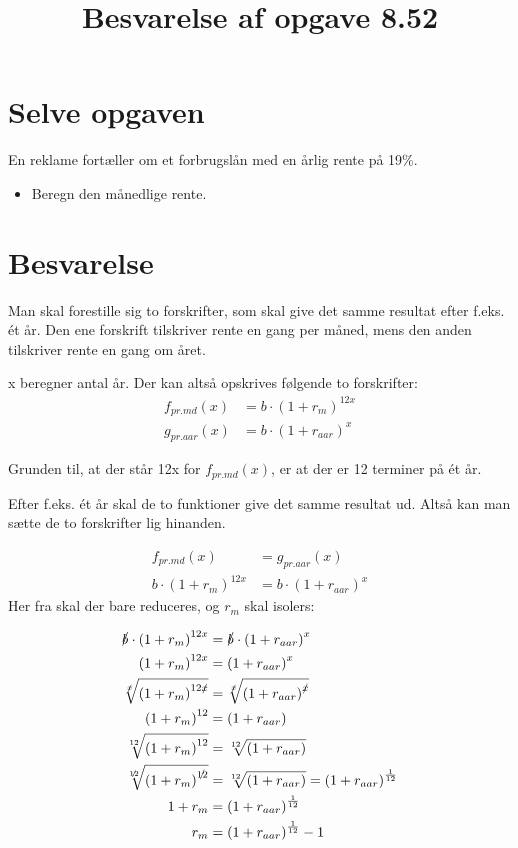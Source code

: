 \documentclass[a4paper, 12pt]{article}
\date{}
\title{Besvarelse af opgave 8.52}
\begin{document}
\maketitle

\section*{Selve opgaven}
\label{sec:orge9c96a3}
En reklame fortæller om et forbrugslån med en årlig rente på 19\%.

\begin{itemize}
\item Beregn den månedlige rente.
\end{itemize}


\section*{Besvarelse}
\label{sec:org3fcb4f5}
Man skal forestille sig to forskrifter, som skal give det samme resultat efter f.eks. ét år. Den ene forskrift tilskriver rente en gang per måned, mens den anden tilskriver rente en gang om året.

x beregner antal år. Der kan altså opskrives følgende to forskrifter:
\begin{align*}
f_{pr.md}(x) &= b \cdot \left(1+r_m\right)^{12x} \\
g_{pr.aar}(x) &= b \cdot \left( 1+r_{aar} \right)^{x}
\end{align*}

Grunden til, at der står 12x for \(f_{pr.md}(x)\), er at der er 12 terminer på ét år.

Efter f.eks. ét år skal de to funktioner give det samme resultat ud. Altså kan man sætte de to forskrifter lig hinanden.

\begin{align*}
f_{pr.md}(x) &= g_{pr.aar}(x) \\
b \cdot \left( 1+r_m \right)^{12x} &= b\cdot \left( 1+r_{aar} \right)^x
\end{align*}
Her fra skal der bare reduceres, og \(r_m\) skal isolers:

\begin{align*}
\slashed{b} \cdot \left( 1+r_m \right)^{12x} &= \slashed{b}\cdot \left( 1+r_{aar} \right)^x \\
\left( 1+r_m \right)^{12x} &= \left( 1+r_{aar} \right)^x \\
\sqrt[\slashed{x}]{\left( 1+r_m \right)^{12 \slashed{x}}} &= \sqrt[\slashed{x}]{\left( 1+r_{aar} \right)^\slashed{x}} \\
\left( 1+r_m \right)^{12} &= \left( 1+r_{aar} \right) \\
\sqrt[12]{\left( 1+r_m \right)^{12}} &= \sqrt[12]{\left( 1+r_{aar} \right)} \\
\sqrt[\slashed{12}]{\left( 1+r_m \right)^{\slashed{12}}} &= \sqrt[12]{\left( 1+r_{aar} \right)} = \left(1+r_{aar} \right)^{\frac{1}{12}}\\
1+r_m  &=\left(1+r_{aar} \right)^{\frac{1}{12}}\\
r_m  &=\left(1+r_{aar} \right)^{\frac{1}{12}} - 1
\end{align*}
\end{document}

